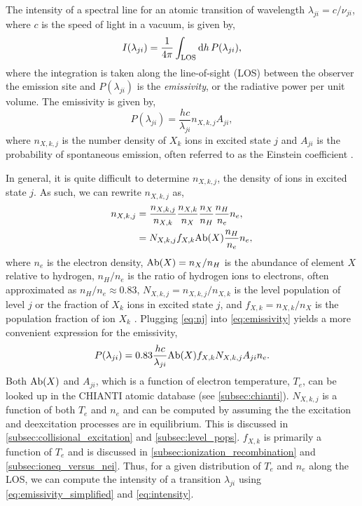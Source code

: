 The intensity of a spectral line for an atomic transition of wavelength $\lambda_{ji}=c/\nu_{ji}$, where $c$ is the speed of light in a vacuum, is given by,
\begin{equation}\label{eq:intensity}
    I(\lambda_{ji}) = \frac{1}{4\pi}\int_\textup{LOS}\textup{d}h\,P(\lambda_{ji}),
\end{equation}
where the integration is taken along the line-of-sight (LOS) between the observer the emission site and $P(\lambda_{ji})$ is the \textit{emissivity}, or the radiative power per unit volume. The emissivity is given by,
\begin{equation}\label{eq:emissivity}
    P(\lambda_{ji}) = \frac{hc}{\lambda_{ji}}n_{X,k,j}A_{ji},
\end{equation}
where $n_{X,k,j}$ is the number density of $X_k$ ions in excited state $j$ and $A_{ji}$ is the probability of spontaneous emission, often referred to as the Einstein coefficient \citep{bradshaw_collisional_2013,del_zanna_solar_2018}.

In general, it is quite difficult to determine $n_{X,k,j}$, the density of ions in excited state $j$. As such, we can rewrite $n_{X,k,j}$ as,
\begin{align}\label{eq:nj}
    n_{X,k,j} &= \frac{n_{X,k,j}}{n_{X,k}}\frac{n_{X,k}}{n_X}\frac{n_X}{n_H}\frac{n_H}{n_e}n_e, \nonumber\\
              &= N_{X,k,j}f_{X,k}\textup{Ab}(X)\frac{n_H}{n_e}n_e,
\end{align}
where $n_e$ is the electron density, $\textup{Ab}(X)=n_X/n_H$ is the abundance of element $X$ relative to hydrogen, $n_H/n_e$ is the ratio of hydrogen ions to electrons, often approximated as $n_H/n_e\approx0.83$, $N_{X,k,j}=n_{X,k,j}/n_{X,k}$ is the level population of level $j$ or the fraction of $X_k$ ions in excited state $j$, and $f_{X,k}=n_{X,k}/n_X$ is the population fraction of ion $X_k$ \citep{del_zanna_solar_2018}. Plugging \autoref{eq:nj} into \autoref{eq:emissivity} yields a more convenient expression for the emissivity,
\begin{equation}\label{eq:emissivity_simplified}
    P(\lambda_{ji}) = 0.83\frac{hc}{\lambda_{ji}}\textup{Ab}(X)f_{X,k}N_{X,k,j}A_{ji}n_e.
\end{equation}
Both $\textup{Ab}(X)$ and $A_{ji}$, which is a function of electron temperature, $T_e$, can be looked up in the CHIANTI atomic database (see \autoref{subsec:chianti}). $N_{X,k,j}$ is a function of both $T_e$ and $n_e$ and can be computed by assuming the the excitation and deexcitation processes are in equilibrium. This is discussed in \autoref{subsec:collisional_excitation} and \autoref{subsec:level_pops}. $f_{X,k}$ is primarily a function of $T_e$ and is discussed in \autoref{subsec:ionization_recombination} and \autoref{subsec:ioneq_versus_nei}. Thus, for a given distribution of $T_e$ and $n_e$ along the LOS, we can compute the intensity of a transition $\lambda_{ji}$ using \autoref{eq:emissivity_simplified} and \autoref{eq:intensity}.


